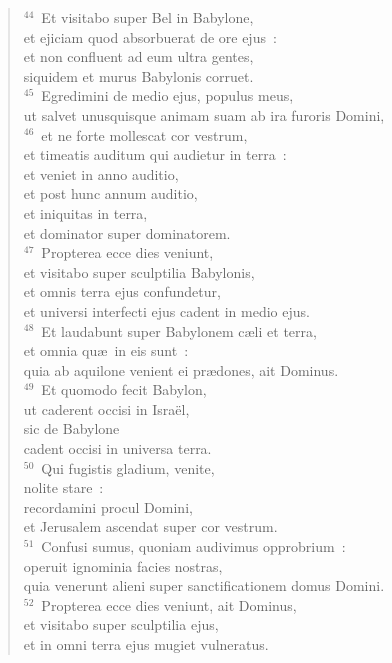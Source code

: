 \begin{flushleft}
\begin{verse}
${}^{44}$~Et visitabo super Bel in Babylone,\\ et ejiciam quod absorbuerat de ore ejus~:\\ et non confluent ad eum ultra gentes,\\ siquidem et murus Babylonis corruet.\\
${}^{45}$~Egredimini de medio ejus, populus meus,\\ ut salvet unusquisque animam suam ab ira furoris Domini,\\
${}^{46}$~et ne forte mollescat cor vestrum,\\ et timeatis auditum qui audietur in terra~:\\ et veniet in anno auditio,\\ et post hunc annum auditio,\\ et iniquitas in terra,\\ et dominator super dominatorem.\\
${}^{47}$~Propterea ecce dies veniunt,\\ et visitabo super sculptilia Babylonis,\\ et omnis terra ejus confundetur,\\ et universi interfecti ejus cadent in medio ejus.\\
${}^{48}$~Et laudabunt super Babylonem c\ae li et terra,\\ et omnia qu\ae\ in eis sunt~:\\ quia ab aquilone venient ei pr\ae dones, ait Dominus.\\
${}^{49}$~Et quomodo fecit Babylon,\\ ut caderent occisi in Isra\"el,\\ sic de Babylone\\ cadent occisi in universa terra.\\
${}^{50}$~Qui fugistis gladium, venite,\\ nolite stare~:\\ recordamini procul Domini,\\ et Jerusalem ascendat super cor vestrum.\\
${}^{51}$~Confusi sumus, quoniam audivimus opprobrium~:\\ operuit ignominia facies nostras,\\ quia venerunt alieni super sanctificationem domus Domini.\\
${}^{52}$~Propterea ecce dies veniunt, ait Dominus,\\ et visitabo super sculptilia ejus,\\ et in omni terra ejus mugiet vulneratus.\\

\end{verse}
\end{flushleft}
